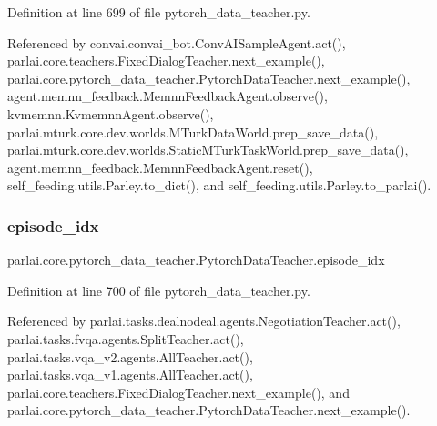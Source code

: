 Definition at line 699 of file pytorch\+\_\+data\+\_\+teacher.\+py.



Referenced by convai.\+convai\+\_\+bot.\+Conv\+A\+I\+Sample\+Agent.\+act(), parlai.\+core.\+teachers.\+Fixed\+Dialog\+Teacher.\+next\+\_\+example(), parlai.\+core.\+pytorch\+\_\+data\+\_\+teacher.\+Pytorch\+Data\+Teacher.\+next\+\_\+example(), agent.\+memnn\+\_\+feedback.\+Memnn\+Feedback\+Agent.\+observe(), kvmemnn.\+Kvmemnn\+Agent.\+observe(), parlai.\+mturk.\+core.\+dev.\+worlds.\+M\+Turk\+Data\+World.\+prep\+\_\+save\+\_\+data(), parlai.\+mturk.\+core.\+dev.\+worlds.\+Static\+M\+Turk\+Task\+World.\+prep\+\_\+save\+\_\+data(), agent.\+memnn\+\_\+feedback.\+Memnn\+Feedback\+Agent.\+reset(), self\+\_\+feeding.\+utils.\+Parley.\+to\+\_\+dict(), and self\+\_\+feeding.\+utils.\+Parley.\+to\+\_\+parlai().

\mbox{\label{classparlai_1_1core_1_1pytorch__data__teacher_1_1PytorchDataTeacher_a096cd29f1b94d0fb626505907280494e}} 
\subsubsection{\texorpdfstring{episode\+\_\+idx}{episode\_idx}}
{\footnotesize\ttfamily parlai.\+core.\+pytorch\+\_\+data\+\_\+teacher.\+Pytorch\+Data\+Teacher.\+episode\+\_\+idx}



Definition at line 700 of file pytorch\+\_\+data\+\_\+teacher.\+py.



Referenced by parlai.\+tasks.\+dealnodeal.\+agents.\+Negotiation\+Teacher.\+act(), parlai.\+tasks.\+fvqa.\+agents.\+Split\+Teacher.\+act(), parlai.\+tasks.\+vqa\+\_\+v2.\+agents.\+All\+Teacher.\+act(), parlai.\+tasks.\+vqa\+\_\+v1.\+agents.\+All\+Teacher.\+act(), parlai.\+core.\+teachers.\+Fixed\+Dialog\+Teacher.\+next\+\_\+example(), and parlai.\+core.\+pytorch\+\_\+data\+\_\+teacher.\+Pytorch\+Data\+Teacher.\+next\+\_\+example().

\mbox{\label{classparlai_1_1core_1_1pytorch__data__teacher_1_1PytorchDataTeacher_ad39ab22ed0829965a4e418ccda1f5b51}} 
